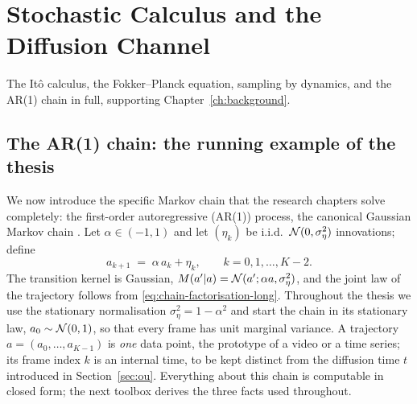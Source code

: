 \chapter{Stochastic Calculus and the Diffusion Channel}
\label{app:stochastic}

The It\^o calculus, the Fokker--Planck equation, sampling by dynamics, and the
AR(1) chain in full, supporting Chapter~\ref{ch:background}.

\section{The AR(1) chain: the running example of the thesis}\label{sec:ar1}

We now introduce the specific Markov chain that the research chapters
solve completely: the first-order autoregressive (AR(1)) process, the
canonical Gaussian Markov chain \citep{brockwell1991time}. Let
$\alpha \in (-1, 1)$ and let $(\eta_k)$ be i.i.d.\
$\mathcal{N}(0, \sigma_\eta^2)$ innovations; define
\begin{equation}
  a_{k+1} \;=\; \alpha\, a_k + \eta_k ,
  \qquad k = 0, 1, \dots, K-2 .
  \label{eq:ar1-long}
\end{equation}
The transition kernel is Gaussian,
$M(a' | a) = \mathcal{N}(a'; \alpha a, \sigma_\eta^2)$, and the joint law of the
trajectory follows from \eqref{eq:chain-factorisation-long}. Throughout the
thesis we use the stationary normalisation
$\sigma_\eta^2 = 1 - \alpha^2$ and start the chain in its stationary law,
$a_0 \sim \mathcal{N}(0,1)$, so that every frame has unit marginal variance. A
trajectory $a = (a_0, \dots, a_{K-1})$ is \emph{one} data point, the
prototype of a video or a time series; its frame index $k$ is an internal
time, to be kept distinct from the diffusion time $t$ introduced in
Section~\ref{sec:ou}. Everything about this chain is computable in closed
form; the next toolbox derives the three facts used throughout.

